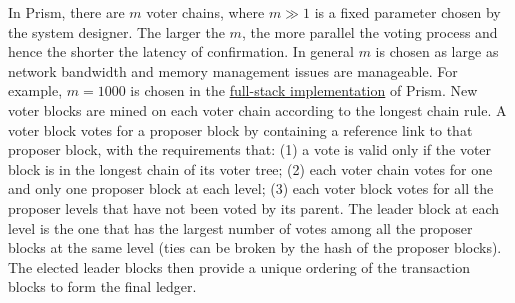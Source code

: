\documentclass{article}
\begin{document}
In {\sf Prism}, there are $m$ voter chains, where $m \gg 1$ is a fixed parameter chosen by the system designer. The larger the $m$, the more parallel the voting process and hence the shorter the latency of confirmation. In general $m$ is chosen as large as network bandwidth and memory management issues are manageable. For example, $m=1000$ is chosen in the \href{https://arxiv.org/pdf/1909.11261.pdf}{full-stack implementation}  of Prism. New voter blocks are mined on each voter chain according to the longest chain rule. A voter block votes for a proposer block by containing a reference link to that proposer block, with the requirements that: (1) a vote is valid only if the voter block is in the longest chain of its voter tree; (2) each voter chain votes for one and only one proposer block at each level; (3) each voter block votes for all the proposer levels that have not been voted by its parent. The leader block at each level is the one that has the largest number of votes among all the proposer blocks at the same level (ties can be broken by the hash of the proposer blocks). The elected leader blocks then provide a unique ordering of the transaction blocks to form the final ledger. 
\end{document}
